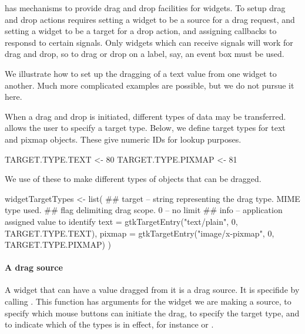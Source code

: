 
\GTK\/ has mechanisms to provide drag and drop facilities for
widgets. To setup drag and drop actions requires setting a widget to
be a source for a drag request, and setting a widget to be a target
for a drop action, and assigning callbacks to responsd to certain
signals.  Only widgets which can receive signals will work for drag
and drop, so to drag or drop on a label, say, an event box must be
used. 

We illustrate how to set up the dragging of a text value from one
widget to another. Much more complicated examples are possible, but we
do not pursue it here.

When a drag and drop is initiated, different types of data may be
transferred. \GTK\/ allows the user to specify a target type. Below,
we define target types for text and pixmap objects. These
give numeric IDs for lookup purposes.
\begin{Schunk}
\begin{Sinput}
 TARGET.TYPE.TEXT   <- 80                 
 TARGET.TYPE.PIXMAP <- 81                  
\end{Sinput}
\end{Schunk}
We use of these to make different types of objects that can be dragged.
\begin{Schunk}
\begin{Sinput}
 widgetTargetTypes <- list(
 ## target -- string representing the drag type. MIME type used.
 ## flag delimiting drag scope. 0 -- no limit
 ## info -- application assigned value to identify
 text = gtkTargetEntry("text/plain", 0, TARGET.TYPE.TEXT),
 pixmap = gtkTargetEntry("image/x-pixmap", 0, TARGET.TYPE.PIXMAP)
 )
\end{Sinput}
\end{Schunk}

\paragraph{A drag source}
A widget that can have a value dragged from it is a drag source. It is
specifide by calling
. This function has arguments
 for the widget we are making a
source,   to specify
which mouse buttons can initiate the drag,
 to specify the target type, and
 to indicate which of the
 types is in effect, for instance  or
. 

